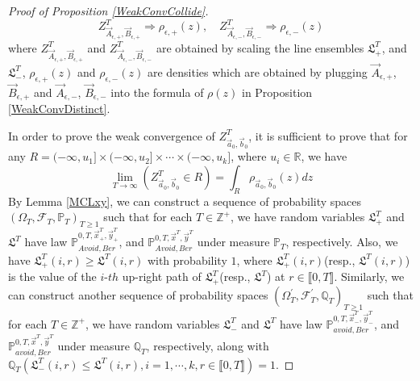 \begin{proof}[Proof of Proposition \ref{WeakConvCollide}]
$$Z^{T}_{\vec{A}_{\epsilon,+}, \vec{B}_{\epsilon, +}}\Rightarrow \rho_{\epsilon,+}(z),\quad Z^{T}_{\vec{A}_{\epsilon,-}, \vec{B}_{\epsilon, -}}\Rightarrow \rho_{\epsilon,-}(z)$$
where $Z^{T}_{\vec{A}_{\epsilon,+},\vec{B}_{\epsilon,+}}$ and $Z^{T}_{\vec{A}_{\epsilon,-},\vec{B}_{\epsilon,-}}$ are obtained by scaling the line ensembles $\mathfrak{L}_{+}^{T}$, and $\mathfrak{L}_{-}^{T}$, $\rho_{\epsilon,+}(z)$ and $\rho_{\epsilon,-}(z)$ are densities which are obtained by plugging $\vec{A}_{\epsilon,+}$, $\vec{B}_{\epsilon,+}$ and $\vec{A}_{\epsilon,-}$, $\vec{B}_{\epsilon,-}$ into the formula of $\rho(z)$ in Proposition \ref{WeakConvDistinct}.

In order to prove the weak convergence of $Z^{T}_{\vec{a}_{0},\vec{b}_{0}}$, it is sufficient to prove that for any $R=(-\infty,u_{1}]\times(-\infty,u_{2}]\times\cdots\times(-\infty,u_{k}]$, where $u_{i}\in\mathbb{R}$, we have $$\lim_{T\rightarrow\infty}(Z^{T}_{\vec{a}_{0},\vec{b}_{0}}\in R)=\int_{R}\rho_{\vec{a}_{0},\vec{b}_{0}}(z)dz$$
By Lemma \ref{MCLxy}, we can construct a sequence of probability spaces $(\Omega_{T},\mathcal{F}_{T},\mathbb{P}_{T})_{T\geqslant 1}$ such that for each $T\in\mathbb{Z}^{+}$, we have random variables $\mathfrak{L}_{+}^{T}$ and $\mathfrak{L}^{T}$ have law $\mathbb{P}_{Avoid,Ber}^{0,T,\vec{x}^{T}_{+},\vec{y}^{T}_{+}}$, and $\mathbb{P}_{Avoid,Ber}^{0,T,\vec{x}^{T},\vec{y}^{T}}$ under measure $\mathbb{P}_{T}$, respectively. Also, we have $\mathfrak{L}_{+}^{T}(i,r)\geqslant \mathfrak{L}^{T}(i,r)$ with probability $1$, where $\mathfrak{L}_{+}^{T}(i,r)$(resp., $\mathfrak{L}^{T}(i,r)$) is the value of the $i$-$th$ up-right path of $\mathfrak{L}_{+}^{T}$(resp., $\mathfrak{L}^{T}$) at $r\in\llbracket 0,T\rrbracket$. Similarly, we can construct another sequence of probability spaces $(\Omega_{T}^{\prime},\mathcal{F}_{T}^{\prime},\mathbb{Q}_{T})_{T\geqslant 1}$ such that for each $T\in\mathbb{Z}^{+}$, we have random variables $\mathfrak{L}_{-}^{T}$ and $\mathfrak{L}^{T}$ have law $\mathbb{P}_{avoid,Ber}^{0,T,\vec{x}^{T}_{-},\vec{y}^{T}_{-}}$, and $\mathbb{P}_{avoid,Ber}^{0,T,\vec{x}^{T},\vec{y}^{T}}$ under measure $\mathbb{Q}_{T}$, respectively, along with $\mathbb{Q}_{T}(\mathfrak{L}_{-}^{T}(i,r)\leqslant \mathfrak{L}^{T}(i,r), i=1,\cdots, k, r\in\llbracket 0,T\rrbracket)=1$.



\end{proof}
